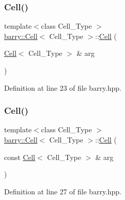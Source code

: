 \subsubsection{\texorpdfstring{Cell()}{Cell()}\hspace{0.1cm}{\footnotesize\ttfamily [3/5]}}
{\footnotesize\ttfamily template$<$class Cell\+\_\+\+Type $>$ \\
\hyperlink{classbarry_1_1_cell}{barry\+::\+Cell}$<$ Cell\+\_\+\+Type $>$\+::\hyperlink{classbarry_1_1_cell}{Cell} (\begin{DoxyParamCaption}\item[{\hyperlink{classbarry_1_1_cell}{Cell}$<$ Cell\+\_\+\+Type $>$ \&}]{arg }\end{DoxyParamCaption})\hspace{0.3cm}{\ttfamily [inline]}}



Definition at line 23 of file barry.\+hpp.

\mbox{\label{classbarry_1_1_cell_ab825f94a5de98ae455224b0720f369f5}} 
\subsubsection{\texorpdfstring{Cell()}{Cell()}\hspace{0.1cm}{\footnotesize\ttfamily [4/5]}}
{\footnotesize\ttfamily template$<$class Cell\+\_\+\+Type $>$ \\
\hyperlink{classbarry_1_1_cell}{barry\+::\+Cell}$<$ Cell\+\_\+\+Type $>$\+::\hyperlink{classbarry_1_1_cell}{Cell} (\begin{DoxyParamCaption}\item[{const \hyperlink{classbarry_1_1_cell}{Cell}$<$ Cell\+\_\+\+Type $>$ \&}]{arg }\end{DoxyParamCaption})\hspace{0.3cm}{\ttfamily [inline]}}



Definition at line 27 of file barry.\+hpp.

\mbox{\label{classbarry_1_1_cell_ae9866b9e53155b7521b5b166e77e542a}} 
